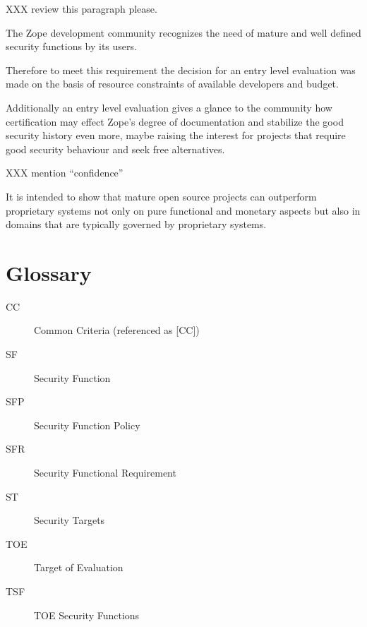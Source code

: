 \documentclass[12pt,english]{scrbook}
\begin{document}
XXX review this paragraph please.

The Zope development community recognizes the need of mature and well defined
security functions by its users.

Therefore to meet this requirement the decision for an entry level evaluation
was made on the basis of resource constraints of available developers and
budget.

Additionally an entry level evaluation gives a glance to the community how
certification may effect Zope's degree of documentation and stabilize the good
security history even more, maybe raising the interest for projects that
require good security behaviour and seek free alternatives.

XXX mention ``confidence''

It is intended to show that mature open source projects can outperform
proprietary systems not only on pure functional and monetary aspects but also
in domains that are typically governed by proprietary systems.





\chapter{Glossary}
\begin{description}
\item[CC]

Common Criteria (referenced as {[}CC])

\item[SF]

Security Function

\item[SFP]

Security Function Policy

\item[SFR]

Security Functional Requirement

\item[ST]

Security Targets

\item[TOE]

Target of Evaluation

\item[TSF]

TOE Security Functions

\end{description}
\end{document}
